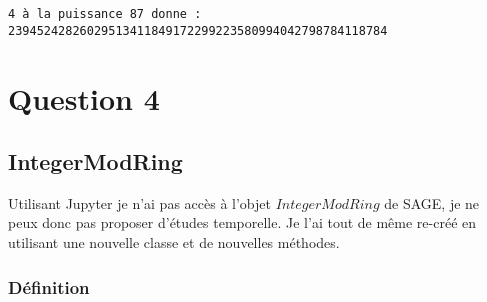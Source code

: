 \documentclass{report}
\newenvironment{code}%
   {\snugshade}%
   {\endsnugshade}
\begin{document}
   \begin{code}\begin{Verbatim}[commandchars=\\\{\}]
4 à la puissance 87 donne : 23945242826029513411849172299223580994042798784118784

    \end{Verbatim}
\end{code}

\section{\texorpdfstring{\textbf{Question
4}}{Question 4}}\label{question-4}

\subsection{\texorpdfstring{\textbf{IntegerModRing}}{IntegerModRing}}\label{integermodring}

Utilisant Jupyter je n'ai pas accès à l'objet \(IntegerModRing\) de
SAGE, je ne peux donc pas proposer d'études temporelle.
Je l'ai tout de même re-créé en utilisant une nouvelle classe et de nouvelles méthodes.

\subsubsection{\texorpdfstring{\textbf{Définition}}{Définition}}\label{duxe9finition}
\end{document}

